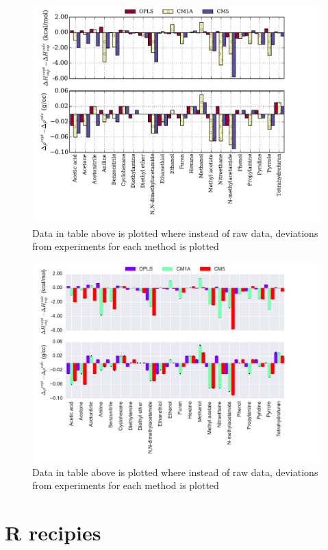 \documentclass[oneside,11pt]{memoir} %
\begin{document}
\pagebreak 

\begin{figure}
\includegraphics[scale=0.40]{python_recipies/Multi_Bar.pdf}
\caption{Data in table above is plotted where instead of raw data, deviations from experiments for each method is plotted}
\end{figure}
\pagebreak 

\begin{figure}
\includegraphics[scale=0.40]{python_recipies/Ers_Multi_Bar.pdf}
\caption{Data in table above is plotted where instead of raw data, deviations from experiments for each method is plotted}
\end{figure}
\part{R recipies}
\end{document}
